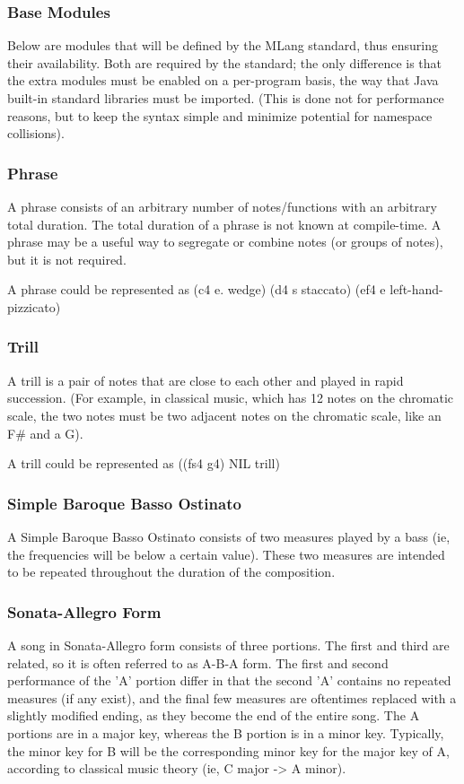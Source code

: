 \documentclass{article}
\begin{document}
\subsubsection{Base Modules}

Below are modules that will be defined by the MLang standard, thus ensuring their availability. Both are required by the standard; the only difference is that the extra modules must be enabled on a per-program basis, the way that Java built-in standard libraries must be imported. (This is done not for performance reasons, but to keep the syntax simple and minimize potential for namespace collisions).

\subsubsection{Phrase}
A phrase consists of an arbitrary number of notes/functions with an arbitrary total duration. The total duration of a phrase is not known at compile-time. A phrase may be a useful way to segregate or combine notes (or groups of notes), but it is not required.


A phrase could be represented as
(c4 e. wedge) (d4 s staccato) (ef4 e left-hand-pizzicato)
\subsubsection{Trill}

A trill is a pair of notes that are close to each other and played in rapid succession. (For example, in classical music, which has 12 notes on the chromatic scale, the two notes must be two adjacent notes on the chromatic scale, like an F\# and a G).


A trill could be represented as
((fs4 g4) NIL trill)
\subsubsection{Simple Baroque Basso Ostinato}
A Simple Baroque Basso Ostinato consists of two measures played by a bass (ie, the frequencies will be below a certain value). These two measures are intended to be repeated throughout the duration of the composition.
\subsubsection{Sonata-Allegro Form}
A song in Sonata-Allegro form consists of three portions. The first and third are related, so it is often referred to as A-B-A form.
The first and second performance of the 'A' portion differ in that the second 'A' contains no repeated measures (if any exist), and the final few measures are oftentimes replaced with a slightly modified ending, as they become the end of the entire song.
The A portions are in a major key, whereas the B portion is in a minor key. Typically, the minor key for B will be the corresponding minor key for the major key of A, according to classical music theory (ie, C major -> A minor).
\end{document}
